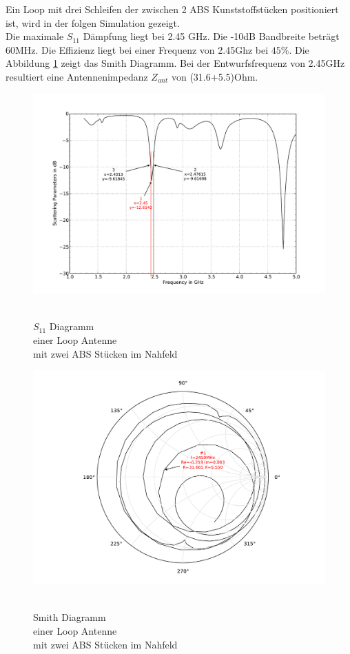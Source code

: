 Ein Loop mit drei Schleifen der zwischen 2 ABS Kunststoffstücken positioniert ist, wird in der folgen Simulation gezeigt.\\
Die maximale $S_{11}$ Dämpfung liegt bei 2.45 GHz. Die -10dB Bandbreite beträgt 60MHz. Die Effizienz liegt bei einer Frequenz von 2.45Ghz bei $45\%$. Die Abbildung \ref{fig:Smith_Loop_2ABS_6} zeigt das Smith Diagramm. Bei der Entwurfsfrequenz von 2.45GHz resultiert eine Antennenimpedanz $Z_{ant}$ von (31.6+5.5)Ohm.
\begin{figure}[!ht]
\begin{center} 
  \includegraphics[width=\linewidth]{content/bilder/Evaluation/Loop/Kurz3/S11Loop2ABS.pdf}
  \caption{\\$S_{11}$ Diagramm \\einer Loop Antenne \\mit zwei ABS Stücken im Nahfeld}\label{fig:S11_Loop_2ABS_5}
\endminipage%
{}
  \includegraphics[width=\linewidth]{content/bilder/Evaluation/Loop/Kurz3/SmithLoop2ABS.pdf}
  \caption{\\Smith Diagramm \\einer Loop Antenne \\mit zwei ABS Stücken im Nahfeld}\label{fig:Smith_Loop_2ABS_6}
\endminipage
\end{center}
\end{figure}

